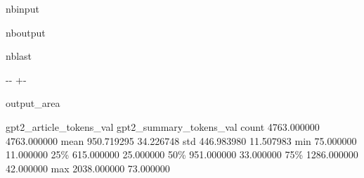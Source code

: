 \documentclass[letterpaper,10pt,english]{sphinxmanual}
\newlength\nbsphinxcodecellspacing
\begin{document}
\begin{sphinxuseclass}{nbinput}
{
\begin{sphinxVerbatim}[commandchars=\\\{\}]
\llap{\color{nbsphinxin}[71]:\,\hspace{\fboxrule}\hspace{\fboxsep}} \PYG{p}{[} \PYG{p}{]}
\end{sphinxVerbatim}
}

\end{sphinxuseclass}
\begin{sphinxuseclass}{nboutput}
\begin{sphinxuseclass}{nblast}
{

\kern-\sphinxverbatimsmallskipamount\kern-\baselineskip
\kern+\FrameHeightAdjust\kern-\fboxrule
\vspace{\nbsphinxcodecellspacing}

\begin{sphinxuseclass}{output_area}
\begin{sphinxuseclass}{}


\begin{sphinxVerbatim}[commandchars=\\\{\}]
\llap{\color{nbsphinxout}[71]:\,\hspace{\fboxrule}\hspace{\fboxsep}}       gpt2\_article\_tokens\_val  gpt2\_summary\_tokens\_val
count              4763.000000              4763.000000
mean                950.719295                34.226748
std                 446.983980                11.507983
min                  75.000000                11.000000
25\%                 615.000000                25.000000
50\%                 951.000000                33.000000
75\%                1286.000000                42.000000
max                2038.000000                73.000000
\end{sphinxVerbatim}



\end{sphinxuseclass}
\end{sphinxuseclass}
}

\end{sphinxuseclass}
\end{sphinxuseclass}
\end{document}

